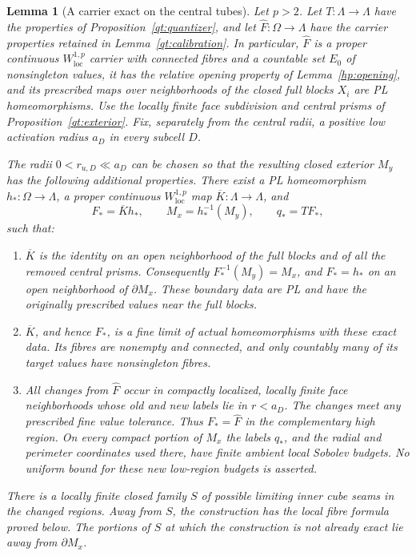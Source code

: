 \documentclass[11pt]{article}
\numberwithin{equation}{section}
\newtheorem{lemma}[theorem]{Lemma}
\theoremstyle{definition}
\theoremstyle{remark}
\begin{document}
\begin{lemma}[A carrier exact on the central tubes]\label{qt:central-carrier}
Let $p>2$.  Let $T:\Lambda\to\Lambda$ have the properties of
Proposition~\ref{qt:quantizer}, and let
$\widehat F:\Omega\to\Lambda$ have the carrier properties retained in
Lemma~\ref{qt:calibration}.  In particular, $\widehat F$ is a proper
continuous $W^{1,p}_{\mathrm{loc}}$ carrier with connected fibres and a
countable set $E_0$ of nonsingleton values, it has the relative opening
property of Lemma~\ref{hp:opening}, and its prescribed maps over
neighborhoods of the closed full blocks $X_i$ are PL homeomorphisms.
Use the locally finite face subdivision and central prisms of
Proposition~\ref{qt:exterior}.  Fix, separately from the central radii, a
positive low activation radius $a_D$ in every subcell $D$.

The radii $0<r_{u,D}\ll a_D$ can be chosen so that the resulting closed
exterior $M_y$ has the following additional properties.  There exist a
PL homeomorphism $h_*:\Omega\to\Lambda$, a proper continuous
$W^{1,p}_{\mathrm{loc}}$ map $\overline K:\Lambda\to\Lambda$, and
\[
 F_*=\overline K h_*,\qquad M_x=h_*^{-1}(M_y),\qquad q_*=TF_* ,
\]
such that:
\begin{enumerate}
\item $\overline K$ is the identity on an open neighborhood of the
full blocks and of all the removed central prisms.  Consequently
$F_*^{-1}(M_y)=M_x$, and $F_*=h_*$ on an open neighborhood of
$\partial M_x$.  These boundary data are PL and have the originally
prescribed values near the full blocks.
\item $\overline K$, and hence $F_*$, is a fine limit of actual
homeomorphisms with these exact data.  Its fibres are nonempty and
connected, and only countably many of its target values have
nonsingleton fibres.
\item All changes from $\widehat F$ occur in compactly localized,
locally finite face neighborhoods whose old and new labels lie in
$r<a_D$.  The changes meet any prescribed fine value tolerance.
Thus $F_*=\widehat F$ in the complementary high region.  On every
compact portion of $M_x$ the labels $q_*$, and the radial and perimeter
coordinates used there, have finite ambient local Sobolev budgets.
No uniform bound for these new low-region budgets is asserted.
\end{enumerate}
There is a locally finite closed family $S$ of possible limiting inner
cube seams in the changed regions.  Away from $S$, the construction
has the local fibre formula proved below.  The portions of $S$ at which
the construction is not already exact lie away from $\partial M_x$.
\end{lemma}
\end{document}
